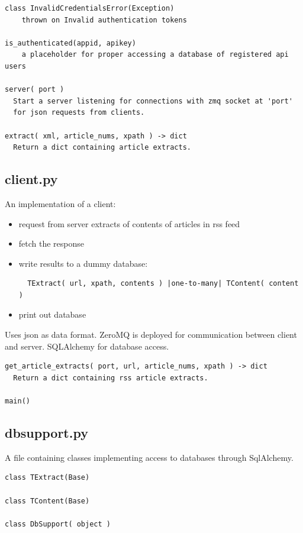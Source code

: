 \documentclass[a4paper,12pt]{article}
\begin{document}
\begin{verbatim}
class InvalidCredentialsError(Exception)
    thrown on Invalid authentication tokens

is_authenticated(appid, apikey)
    a placeholder for proper accessing a database of registered api users

server( port )
  Start a server listening for connections with zmq socket at 'port'
  for json requests from clients.

extract( xml, article_nums, xpath ) -> dict
  Return a dict containing article extracts.
\end{verbatim}




\subsection{client.py}

An implementation of a client:
\begin{itemize}
 \item request from server extracts of contents of articles in rss feed
 \item fetch the response
 \item write results to a dummy database:
 \begin{verbatim}
  TExtract( url, xpath, contents ) |one-to-many| TContent( content )
\end{verbatim}
 \item print out database
\end{itemize}

Uses json as data format.
ZeroMQ is deployed for communication between client and server.
SQLAlchemy for database access.


\begin{verbatim}
get_article_extracts( port, url, article_nums, xpath ) -> dict
  Return a dict containing rss article extracts.

main()
\end{verbatim}




\subsection{dbsupport.py}

A file containing classes implementing access to databases through SqlAlchemy.

\begin{verbatim}
class TExtract(Base)

class TContent(Base)

class DbSupport( object )
\end{verbatim}
\end{document}

